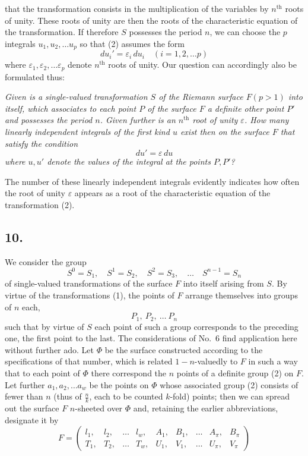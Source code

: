 \documentclass{article}
\begin{document}
that the transformation consists in the multiplication of the variables by $n^{\text{th}}$ roots of unity. These roots of unity are then the roots of the characteristic equation of the transformation. If therefore $S$ possesses the period $n$, we can choose the $p$ integrals $u_1, u_2, \dots u_p$ so that (2) assumes the form
\[
du_i' = \varepsilon_i\,du_i \quad (i = 1, 2, \dots p)
\tag{4}
\]
where $\varepsilon_1, \varepsilon_2, \dots \varepsilon_p$ denote $n^{\text{th}}$ roots of unity. Our question can accordingly also be formulated thus:

\emph{Given is a single-valued transformation $S$ of the Riemann surface $F(p > 1)$ into itself, which associates to each point $P$ of the surface $F$ a definite other point $P'$ and possesses the period $n$. Given further is an $n^{\text{th}}$ root of unity $\varepsilon$. How many linearly independent integrals of the first kind $u$ exist then on the surface $F$ that satisfy the condition}
\[
du' = \varepsilon\,du
\]
\emph{where $u, u'$ denote the values of the integral at the points $P, P'$?}

The number of these linearly independent integrals evidently indicates how often the root of unity $\varepsilon$ appears as a root of the characteristic equation of the transformation (2).

\subsection*{10.}

We consider the group
\[
S^0 = S_1, \quad S^1 = S_2, \quad S^2 = S_3, \quad \dots \quad S^{n-1} = S_n
\tag{1}
\]
of single-valued transformations of the surface $F$ into itself arising from $S$. By virtue of the transformations (1), the points of $F$ arrange themselves into groups of $n$ each,
\[
P_1, \ P_2, \ \dots \ P_n
\tag{2}
\]
such that by virtue of $S$ each point of such a group corresponds to the preceding one, the first point to the last. The considerations of No.~6 find application here without further ado. Let $\Phi$ be the surface constructed according to the specifications of that number, which is related $1-n$-valuedly to $F$ in such a way that to each point of $\Phi$ there correspond the $n$ points of a definite group (2) on $F$. Let further $a_1, a_2, \dots a_w$ be the points on $\Phi$ whose associated group (2) consists of fewer than $n$ (thus of $\frac{n}{k}$, each to be counted $k$-fold) points; then we can spread out the surface $F$ $n$-sheeted over $\Phi$ and, retaining the earlier abbreviations, designate it by
\[
F = \begin{pmatrix}
l_1, & l_2, & \dots & l_w, & A_1, & B_1, & \dots & A_\pi, & B_\pi \\
T_1, & T_2, & \dots & T_w, & U_1, & V_1, & \dots & U_\pi, & V_\pi
\end{pmatrix}
\tag{3}
\]
\end{document}
